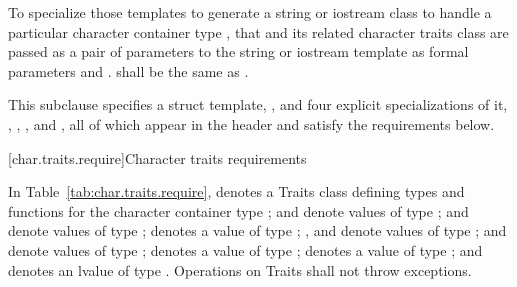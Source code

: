\pnum
To specialize those templates to generate a string or
iostream class to handle a particular character container type
,
that and its related character traits class
are passed as a pair of parameters to the string or iostream template as
formal parameters
and
.
shall be the same as
.

\pnum
This subclause specifies a struct template,
,
and four explicit specializations of it,
,
,
,
and
,
all of which appear in the header
and satisfy the requirements below.

[char.traits.require]{Character traits requirements}

\pnum
In Table~\ref{tab:char.traits.require},
denotes a Traits class defining types and functions for the
character container type
;
and
denote values of type
;
and
denote values of type
;
denotes a value of type
;
,
and
denote values of type
;
and
denote values of type
;
denotes a value of type
;
denotes a value of type
;
and
denotes an lvalue of type
.
Operations on Traits shall not throw exceptions.

